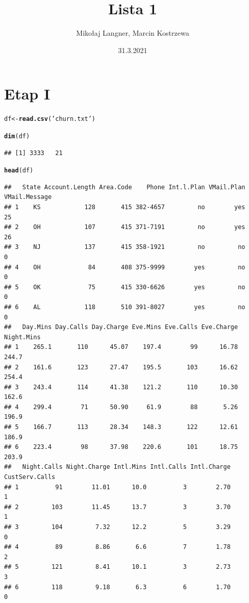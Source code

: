 \documentclass{article}\usepackage[]{graphicx}\usepackage[]{color}
\title{Lista 1}
\author{Mikołaj Langner, Marcin Kostrzewa}
\date{31.3.2021}
\makeatletter
\newcommand{\hlstr}[1]{\textcolor[rgb]{0.192,0.494,0.8}{#1}}%
\newcommand{\hlstd}[1]{\textcolor[rgb]{0.345,0.345,0.345}{#1}}%
\newcommand{\hlkwb}[1]{\textcolor[rgb]{0.69,0.353,0.396}{#1}}%
\newcommand{\hlkwd}[1]{\textcolor[rgb]{0.737,0.353,0.396}{\textbf{#1}}}%
\newenvironment{kframe}{%
 \def\at@end@of@kframe{}%
 \ifinner\ifhmode%
  \def\at@end@of@kframe{\end{minipage}}%
  \begin{minipage}{\columnwidth}%
 \fi\fi%
 \def\FrameCommand##1{\hskip\@totalleftmargin \hskip-\fboxsep
 \colorbox{shadecolor}{##1}\hskip-\fboxsep
     \hskip-\linewidth \hskip-\@totalleftmargin \hskip\columnwidth}%
 \MakeFramed {\advance\hsize-\width
   \@totalleftmargin\z@ \linewidth\hsize
   \@setminipage}}%
 {\par\unskip\endMakeFramed%
 \at@end@of@kframe}
\newenvironment{knitrout}{}{} %
\makeatother
\begin{document}
\section{Etap I}

\begin{knitrout}
\color{fgcolor}\begin{kframe}
\begin{alltt}
\hlstd{df} \hlkwb{<-} \hlkwd{read.csv}\hlstd{(}\hlstr{'churn.txt'}\hlstd{)}

\hlkwd{dim}\hlstd{(df)}
\end{alltt}
\begin{verbatim}
## [1] 3333   21
\end{verbatim}
\begin{alltt}
\hlkwd{head}\hlstd{(df)}
\end{alltt}
\begin{verbatim}
##   State Account.Length Area.Code    Phone Int.l.Plan VMail.Plan VMail.Message
## 1    KS            128       415 382-4657         no        yes            25
## 2    OH            107       415 371-7191         no        yes            26
## 3    NJ            137       415 358-1921         no         no             0
## 4    OH             84       408 375-9999        yes         no             0
## 5    OK             75       415 330-6626        yes         no             0
## 6    AL            118       510 391-8027        yes         no             0
##   Day.Mins Day.Calls Day.Charge Eve.Mins Eve.Calls Eve.Charge Night.Mins
## 1    265.1       110      45.07    197.4        99      16.78      244.7
## 2    161.6       123      27.47    195.5       103      16.62      254.4
## 3    243.4       114      41.38    121.2       110      10.30      162.6
## 4    299.4        71      50.90     61.9        88       5.26      196.9
## 5    166.7       113      28.34    148.3       122      12.61      186.9
## 6    223.4        98      37.98    220.6       101      18.75      203.9
##   Night.Calls Night.Charge Intl.Mins Intl.Calls Intl.Charge CustServ.Calls
## 1          91        11.01      10.0          3        2.70              1
## 2         103        11.45      13.7          3        3.70              1
## 3         104         7.32      12.2          5        3.29              0
## 4          89         8.86       6.6          7        1.78              2
## 5         121         8.41      10.1          3        2.73              3
## 6         118         9.18       6.3          6        1.70              0

\end{verbatim}
\end{kframe}
\end{knitrout}
\end{document}
